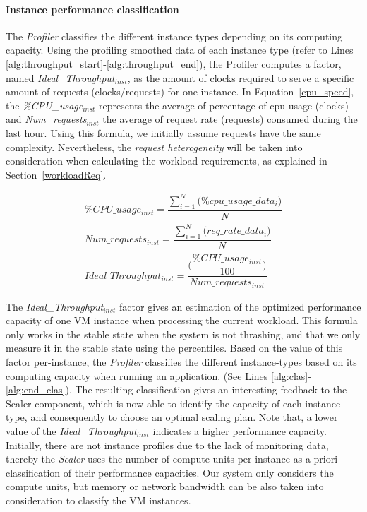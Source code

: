 \paragraph{Instance performance classification} The \emph{Profiler} classifies the different instance types depending on its computing capacity. Using the profiling smoothed data of each instance type (refer to Lines \ref{alg:throughput_start}-\ref{alg:throughput_end}), the Profiler computes a factor, named \emph{Ideal\_Throughput$_{inst}$}, as the amount of clocks required to serve a specific amount of requests (clocks/requests)  for one instance. In Equation~\ref{cpu_speed}, the \emph{\%CPU\_usage$_{inst}$} represents the average of percentage of cpu usage (clocks) and \emph{Num\_requests$_{inst}$} the average of request rate (requests) consumed during the last hour. Using this formula, we initially assume requests have the same complexity. Nevertheless, the \emph{request heterogeneity} will be taken into consideration when calculating the workload requirements, as explained in Section~\ref{workloadReq}.


\vspace{-5mm}
{\scriptsize
\begin{equation}\label{cpu_speed}
\begin{split}
\% CPU\_usage_{inst} = \dfrac{   \sum_{i=1}^N \big( \% cpu\_usage\_data_{i}  \big) } { N } \\
Num\_requests_{inst} = \dfrac{   \sum_{i=1}^N \big( req\_rate\_data_{i} \big) } { N } \\
Ideal\_Throughput_{inst} =\dfrac{ \bigg( \dfrac{\% CPU\_usage_{inst} } { 100 }  \bigg) } {  Num\_requests_{inst}   } 
\end{split}
\end{equation}
}

The \emph{Ideal\_Throughput$_{inst}$} factor gives an estimation of the optimized performance capacity of one VM instance when processing the current workload. This formula only works in the stable state when the system is not thrashing, and that we only measure it in the stable state using the percentiles. Based on the value of this factor per-instance, the \emph{Profiler} classifies the different instance-types based on its computing capacity when running an application. (See Lines \ref{alg:clas}-\ref{alg:end_clas}). The resulting classification gives an interesting feedback to the Scaler component, which is now able to identify the capacity of each instance type, and consequently to choose an optimal scaling plan. Note that, a lower value of the \emph{Ideal\_Throughput$_{inst}$} indicates a higher performance capacity. Initially, there are not instance profiles due to the lack of monitoring data, thereby the \emph{Scaler} uses the number of compute units per instance as a priori classification of their performance capacities. Our system only considers the compute units, but memory or network bandwidth can be also taken into consideration to classify the VM instances.

